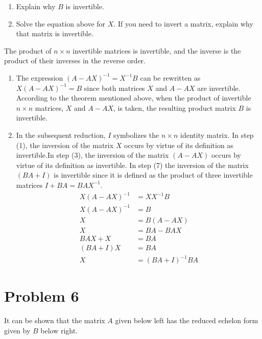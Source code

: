 \documentclass[letter,11pt]{article}
\begin{document}
\begin{enumerate}[label = \roman*.]
    \item Explain why $B$ is invertible.
    \item Solve the equation above for $X$. If you need to invert a matrix, explain why that matrix is invertible.
\end{enumerate}
\begin{tcolorbox}[boxrule=1mm, width=(.9\linewidth),before=\hfill,after=\hfill,adjusted title={Problem 5 Solutions}]
The product of $n\times n$ invertible matrices is invertible, and the inverse is the product of their inverses in the reverse order.
\tcblower

    \begin{enumerate}[label = \roman*.]
        \item The expression $(A - AX)^{-1} = X^{-1}B$ can be rewritten as $X(A - AX)^{-1} =B$ since both matrices $X$ and $A - AX$ are invertible. According to the theorem mentioned above, when the product of invertible $n \times n$ matrices, $X$ and $A - AX$, is taken, the resulting product matrix $B$ is invertible.
        \item In the subsequent reduction, $I$ symbolizes the $n \times n$ identity matrix. In step (1), the inversion of the matrix $X$ occurs by virtue of its definition as invertible.In step (3), the inversion of the matrix $(A-AX)$ occurs by virtue of its definition as invertible. In step (7) the inversion of the matrix $(BA+I)$ is invertible since it is defined as the product of three invertible matrices $I+BA = BAX^{-1}$. 
            \begin{align}
                X(A-AX)^{-1} &= XX^{-1}B\\
                X(A-AX)^{-1} &= B\\
                X &= B(A-AX)\\
                X &= BA - BAX\\
                BAX+X&=BA\\
                (BA+I)X &= BA\\
                X&=(BA+I)^{-1}BA
            \end{align}
    \end{enumerate}
\end{tcolorbox}

\newpage
\section{Problem 6}
It can be shown that the matrix $A$ given below left has the reduced echelon form given by $B$ below right.
\end{document}
